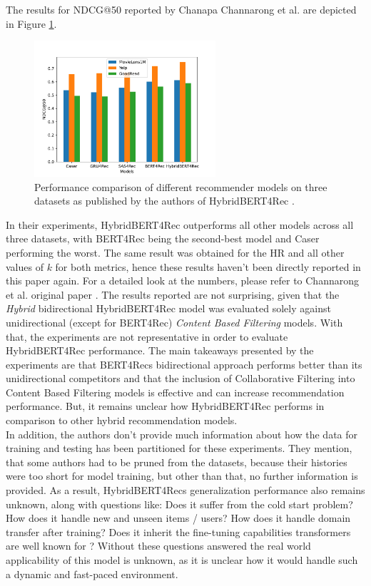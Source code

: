 \documentclass{Academic}
\begin{document}
        The results for NDCG@50 reported by Chanapa Channarong et al. \cite{channarongHybridBERT4RecHybridContentBased2022} are depicted in Figure \ref{fig:perfExp}.
        \begin{figure}[ht!]
            \centering
			\includegraphics[width=0.6\textwidth]{images/results.pdf}
			\caption{Performance comparison of different recommender models on three datasets as published by the authors of HybridBERT4Rec \cite{channarongHybridBERT4RecHybridContentBased2022}.}
            \label{fig:perfExp}
		\end{figure}
        In their experiments, HybridBERT4Rec outperforms all other models across all three datasets, with BERT4Rec being the second-best model and Caser performing the worst. The same result was obtained for the HR and all other values of $k$ for both metrics, hence these results haven't been directly reported in this paper again. For a detailed look at the numbers, please refer to Channarong et al. original paper \cite{channarongHybridBERT4RecHybridContentBased2022}. The results reported are not surprising, given that the \textit{Hybrid} bidirectional HybridBERT4Rec model was evaluated solely against unidirectional (except for BERT4Rec) \textit{Content Based Filtering} models. With that, the experiments are not representative in order to evaluate HybridBERT4Rec performance. The main takeaways presented by the experiments are that BERT4Recs bidirectional approach performs better than its unidirectional competitors and that the inclusion of Collaborative Filtering into Content Based Filtering models is effective and can increase recommendation performance. But, it remains unclear how HybridBERT4Rec performs in comparison to other hybrid recommendation models.\\
        In addition, the authors don't provide much information about how the data for training and testing has been partitioned for these experiments. They mention, that some authors had to be pruned from the datasets, because their histories were too short for model training, but other than that, no further information is provided. As a result, HybridBERT4Recs generalization performance also remains unknown, along with questions like: Does it suffer from the cold start problem? How does it handle new and unseen items / users? How does it handle domain transfer after training? Does it inherit the fine-tuning capabilities transformers are well known for \cite{radfordImprovingLanguageUnderstanding}? Without these questions answered the real world applicability of this model is unknown, as it is unclear how it would handle such a dynamic and fast-paced environment.
\end{document}
